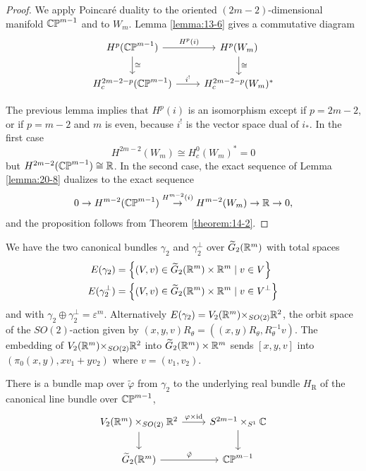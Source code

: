 \begin{proof}
  We apply Poincaré duality to the oriented $(2m- 2)$-dimensional manifold ${\mathbb{CP}}^{m- 1}$ and to ${W}_{m}$. 
  Lemma \ref{lemma:13-6} gives a commutative diagram
  \[\begin{tikzcd}
    H^p(\CP^{m-1})\dar{\simee}\rar{H^p(i)} & H^p(W_m)\dar{\simee}\\
    H_{c}^{2m-2-p}(\CP^{m-1})\rar{i^!} & H_{c}^{2m-2-p}(W_m)^*
  \end{tikzcd}\]
  
  The previous lemma implies that $H^{p}( i)$ is an isomorphism except if $p = {2m}- 2$, or 
  if $p = m- 2$ and $m$ is even, because ${i}^{!}$ is the vector space dual of ${i}_{ * }$. 
  In the first case
  \[
    H^{{2m}- 2}( {W}_{m})  \cong  H_{c}^{0}{( {W}_{m}) }^* = 0
  \]
  but $H^{{2m}- 2}( {\mathbb{CP}}^{m- 1})  \cong  \mathbb{R}$. In the second case, the exact sequence of Lemma \ref{lemma:20-8} 
  dualizes to the exact sequence
  \[
    0 \rightarrow  H^{m- 2}( {\mathbb{CP}}^{m- 1}) \overset{H^{m- 2}( i) }{ \rightarrow  }H^{m- 2}( {W}_{m})  \rightarrow  \mathbb{R} \rightarrow  0,
  \]
  and the proposition follows from Theorem \ref{theorem:14-2}.
\end{proof}

We have the two canonical bundles ${\gamma }_{2}$ and ${\gamma }_{2}^{ \bot  }$ over $\widetilde{G}_{2}( {{\mathbb{R}}^m})$ 
with total spaces
\begin{align*}
  E( {\gamma }_{2}) & = \left\{  {( {V,v})  \in  \widetilde{G}_{2}( {{\mathbb{R}}^m})  \times  {{\ensuremath{\mathbb{R}}}^m} \mid  v \in  V}\right\}\\
  E( {\gamma }_{2}^{ \bot  }) & = \left\{  {( {V,v})  \in  \widetilde{G}_{2}( {{\mathbb{R}}^m})  \times  {{\ensuremath{\mathbb{R}}}^m} \mid  v \in  {V}^{ \bot  }}\right\}  
\end{align*}
and with ${\gamma }_{2} \oplus  {\gamma }_{2}^{ \bot  } = {\varepsilon }^{m}$. Alternatively $E( {\gamma }_{2})  = {V}_{2}( {{\mathbb{R}}^m}) { \times  }_{{SO}( 2) }{\mathbb{R}}^{2}$, 
the orbit space of the ${SO}( 2)$-action given by $( {x,y,v}) {R}_{\theta } = ( {( {x,y}) {R}_{\theta },{R}_{\theta }^{-1}v})$. 
The embedding of ${V}_{2}( {{\mathbb{R}}^m}) { \times  }_{{SO}( 2) }{\mathbb{R}}^{2}$ into $\widetilde{G}_{2}( {{\mathbb{R}}^m})  \times  {{\ensuremath{\mathbb{R}}}^m}$ 
sends $[  {x,y,v}]$ into $( {{\pi }_{0}( {x,y}),x{v}_{1} + y{v}_{2}})$ where $v = ( {{v}_{1},{v}_{2}})$.

There is a bundle map over $\widetilde{\varphi }$ from ${\gamma }_{2}$ to the underlying real bundle $H_{\mathrm{R}}$ of 
the canonical line bundle over ${\mathbb{CP}}^{m- 1}$,
\[\begin{tikzcd}
  V_2(\RR^m)\times_{SO(2)}\RR^2\rar{\varphi\times\id}\dar{} & S^{2m-1}\times_{S^1}\CC\dar{}\\
  \widetilde{G}_2(\RR^m)\rar{\tilde{\varphi}} & \CP^{m-1}
\end{tikzcd}\]

